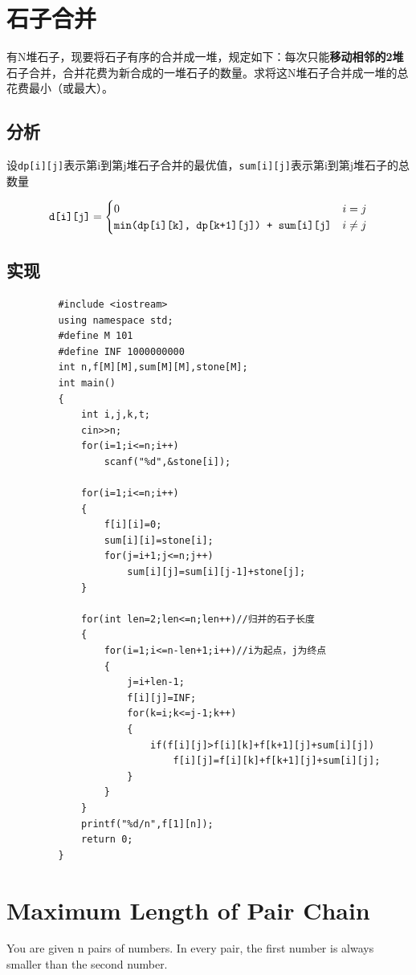 \documentclass[UTF8,a4paper,12pt]{ctexbook}
\begin{document}
\section{石子合并}
	有N堆石子，现要将石子有序的合并成一堆，规定如下：每次只能\textbf{移动相邻的2堆}石子合并，合并花费为新合成的一堆石子的数量。求将这N堆石子合并成一堆的总花费最小（或最大）。
	
	\subsection{分析}
		  设\verb|dp[i][j]|表示第i到第j堆石子合并的最优值，\verb|sum[i][j]|表示第i到第j堆石子的总数量
		  
		  $$\verb|d[i][j]|=
		  			\begin{cases}
		  				0 & i=j\\
		  			\verb|min(dp[i][k], dp[k+1][j]) + sum[i][j]| & i \not= j\\
		  			\end{cases}$$	
	  
	  \subsection{实现}
	  		\begin{lstlisting}
	     #include <iostream>     
	     using namespace std;  
	     #define M 101  
	     #define INF 1000000000  
	     int n,f[M][M],sum[M][M],stone[M];  
	     int main()  
	     {  
	         int i,j,k,t;  
	         cin>>n;  
	         for(i=1;i<=n;i++)  
	             scanf("%d",&stone[i]);  
	       
	         for(i=1;i<=n;i++)  
	         {  
	             f[i][i]=0;  
	             sum[i][i]=stone[i];  
	             for(j=i+1;j<=n;j++)  
	                 sum[i][j]=sum[i][j-1]+stone[j];  
	         }  
	       
	         for(int len=2;len<=n;len++)//归并的石子长度  
	         {  
	             for(i=1;i<=n-len+1;i++)//i为起点，j为终点  
	             {  
	                 j=i+len-1;  
	                 f[i][j]=INF;  
	                 for(k=i;k<=j-1;k++)  
	                 {  
	                     if(f[i][j]>f[i][k]+f[k+1][j]+sum[i][j])  
	                         f[i][j]=f[i][k]+f[k+1][j]+sum[i][j];  
	                 }  
	             }  
	         }  
	         printf("%d/n",f[1][n]);    
	         return 0;  
	     }  
	  		\end{lstlisting}
\section{Maximum Length of Pair Chain}
	You are given n pairs of numbers. In every pair, the first number is always smaller than the second number.
	
\end{document}
